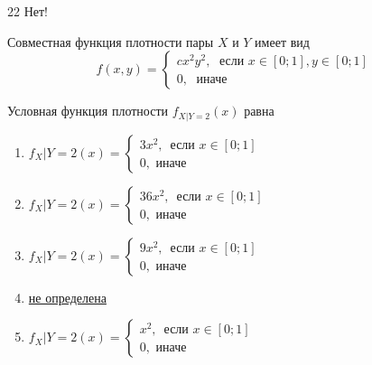\documentclass[t]{beamer}
\begin{document}
 \begin{frame} \label{22-No} 
\begin{block}{22 \alert{Нет!}} 

Совместная функция плотности пары $X$ и $Y$ имеет вид
\[
f(x,y)=\begin{cases}
cx^2y^2, \; \text{ если } x\in[0;1], y\in [0;1] \\
0, \; \text{ иначе}
\end{cases}
\]
 
Условная функция плотности  $f_{X|Y=2}(x)$ равна
 
 \end{block} 
\begin{enumerate} 
\item[] \hyperlink{22-No}{\beamergotobutton{} $f_X|Y=2(x)=\begin{cases} 3x^2,\, \text{ если }  x\in [0;1] \\ 0, \text{ иначе}     \end{cases}$}
\item[] \hyperlink{22-No}{\beamergotobutton{} $f_X|Y=2(x)=\begin{cases} 36x^2,\, \text{ если }  x\in [0;1] \\ 0, \text{ иначе}     \end{cases}$}
\item[] \hyperlink{22-No}{\beamergotobutton{} $f_X|Y=2(x)=\begin{cases} 9x^2,\, \text{ если }  x\in [0;1] \\ 0, \text{ иначе}     \end{cases}$}
\item[] \hyperlink{22-Yes}{\beamergotobutton{} не определена}
\item[] \hyperlink{22-No}{\beamergotobutton{} $f_X|Y=2(x)=\begin{cases} x^2,\, \text{ если }  x\in [0;1] \\ 0, \text{ иначе}     \end{cases}$}
\end{enumerate} 
\end{frame} 
\end{document}
